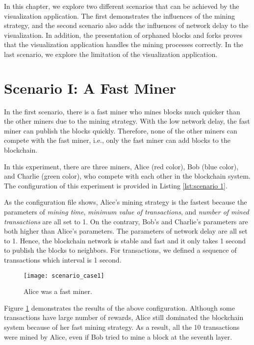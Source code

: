In this chapter, we explore two different scenarios that can be achieved by the visualization application. The first demonstrates the influences of the mining strategy, and the second scenario also adds the influences of network delay to the visualization. In addition, the presentation of orphaned blocks and forks proves that the visualization application handles the mining processes correctly. In the last scenario, we explore the limitation of the visualization application.

\section{Scenario I: A Fast Miner}

In the first scenario, there is a fast miner who mines blocks much quicker than the other miners due to the mining strategy. With the low network delay, the fast miner can publish the blocks quickly. Therefore, none of the other miners can compete with the fast miner, i.e., only the fast miner can add blocks to the blockchain.

In this experiment, there are three miners, Alice (red color), Bob (blue color), and Charlie (green color), who compete with each other in the blockchain system. The configuration of this experiment is provided in Listing \ref{lst:scenario 1}.

As the configuration file shows, Alice's mining strategy is the fastest because the parameters of \textit{mining time}, \textit{minimum value of transactions}, and \textit{number of mined transactions} are all set to 1. On the contrary, Bob's and Charlie's parameters are both higher than Alice's parameters. The parameters of network delay are all set to 1. Hence, the blockchain network is stable and fast and it only takes 1 second to publish the blocks to neighbors. For transactions, we defined a sequence of transactions which interval is 1 second.

\begin{figure}[htb]
    \centering
    \texttt{[image: scenario\_case1]}
    \caption{Alice was a fast miner.}
    \label{fig:alice was a fast miner}
\end{figure}

Figure \ref{fig:alice was a fast miner} demonstrates the results of the above configuration. Although some transactions have large number of rewards, Alice still dominated the blockchain system because of her fast mining strategy. As a result, all the 10 transactions were mined by Alice, even if Bob tried to mine a block at the seventh layer. 


